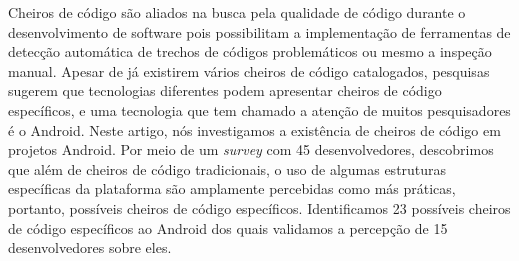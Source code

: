 Cheiros de código são aliados na busca pela qualidade de código durante o desenvolvimento de software pois possibilitam a implementação de ferramentas de detecção automática de trechos de códigos problemáticos ou mesmo a inspeção manual. Apesar de já existirem vários cheiros de código catalogados, pesquisas sugerem que tecnologias diferentes podem apresentar cheiros de código específicos, e uma tecnologia que tem chamado a atenção de muitos pesquisadores é o Android. Neste artigo, nós investigamos a existência de cheiros de código em projetos Android. Por meio de um \textit{survey} com 45 desenvolvedores, descobrimos que além de cheiros de código tradicionais, o uso de algumas estruturas específicas da plataforma são amplamente percebidas como más práticas, portanto, possíveis cheiros de código específicos. Identificamos 23 possíveis cheiros de código específicos ao Android dos quais validamos a percepção de 15 desenvolvedores sobre eles. 
